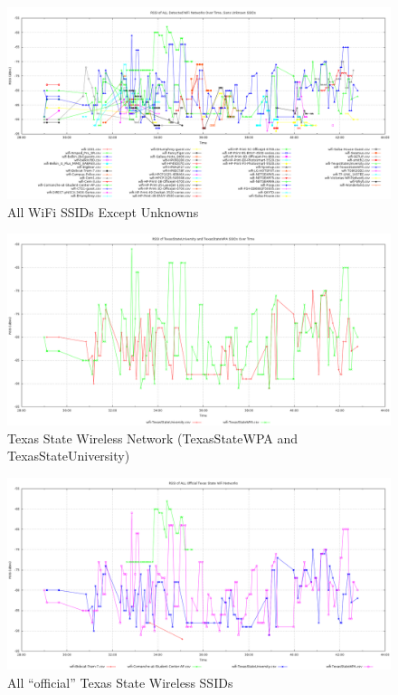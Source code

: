 \documentclass[journal,twocolumn]{IEEEtran}
\begin{document}
\begin{figure}
\begin{center}
\includegraphics[scale=0.3]{wifi-data/002-all-but-unknowns.png}
\caption{All WiFi SSIDs Except Unknowns}
\label{fig_wifi_2}
\end{center}
\end{figure}

\begin{figure}
\begin{center}
\includegraphics[scale=0.3]{wifi-data/003-texas-state-wireless.png}
\caption{Texas State Wireless Network (TexasStateWPA and TexasStateUniversity)}
\label{fig_wifi_3}
\end{center}
\end{figure}

\begin{figure}
\begin{center}
\includegraphics[scale=0.3]{wifi-data/004-official-txstate.png}
\caption{All ``official'' Texas State Wireless SSIDs}
\label{fig_wifi_4}
\end{center}
\end{figure}
\end{document}
